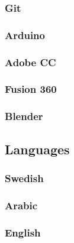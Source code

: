 \documentclass{article}
\begin{document}
\begin{multicols}{2}
            \subsubsection{Git}
            \subsubsection{Arduino}
            \subsubsection{Adobe CC}
            \subsubsection{Fusion 360}
            \subsubsection{Blender}
        \subsection{Languages}
            \subsubsection{Swedish}
            \subsubsection{Arabic}
            \subsubsection{English}
    \end{multicols}
\end{document}
